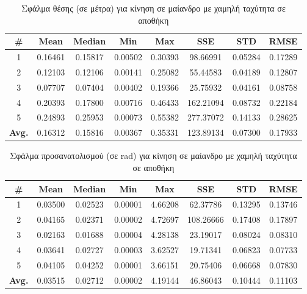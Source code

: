 \begin{table}[H]
    \begin{center}
        \centering
        \caption{Σφάλμα θέσης (σε μέτρα) για κίνηση σε μαίανδρο με χαμηλή ταχύτητα σε αποθήκη}
        \label{tab:position_error_meander_slow_warehouse}
        \begin{tabular}{| c | c | c | c | c | c | c | c | }
        \hline
        \rowcolor{Gray}
        \# & Mean & Median & Min & Max & SSE & STD & RMSE \\
        \hline
        1 & 0.16461 & 0.15817 & 0.00502 & 0.30393 & 98.66991 & 0.05284 & 0.17289 \\
        2 & 0.12103 & 0.12106 & 0.00141 & 0.25082 & 55.44583 & 0.04189 & 0.12807 \\
        3 & 0.07707 & 0.07404 & 0.00402 & 0.19366 & 25.75932 & 0.04161 & 0.08758 \\
        4 & 0.20393 & 0.17800 & 0.00716 & 0.46433 & 162.21094 & 0.08732 & 0.22184 \\
        5 & 0.24893 & 0.25953 & 0.00073 & 0.55382 & 277.37072 & 0.14133 & 0.28625 \\
        \hline
        \textbf{Avg.} & 0.16312 & 0.15816 & 0.00367 & 0.35331 & 123.89134 & 0.07300 & 0.17933 \\
        \hline
        \end{tabular}
    \end{center}
\end{table}

\begin{table}[H]
    \centering
    \caption{Σφάλμα προσανατολισμού (σε rad) για κίνηση σε μαίανδρο με χαμηλή ταχύτητα σε αποθήκη}
    \label{tab:orientation_error_meander_slow_warehouse}
    \begin{tabular}{| c | c | c | c | c | c | c | c | }
        \hline
        \rowcolor{Gray}
        \# & Mean & Median & Min & Max & SSE & STD & RMSE \\
        \hline
        1 & 0.03500 & 0.02523 & 0.00001 & 4.66208 & 62.37786 & 0.13295 & 0.13746 \\
        2 & 0.04165 & 0.02371 & 0.00002 & 4.72697 & 108.26666 & 0.17408 & 0.17897 \\
        3 & 0.02163 & 0.01688 & 0.00004 & 4.28138 & 23.19017 & 0.08024 & 0.08310 \\
        4 & 0.03641 & 0.02727 & 0.00003 & 3.62527 & 19.71341 & 0.06823 & 0.07733 \\
        5 & 0.04105 & 0.04252 & 0.00001 & 3.66151 & 20.75406 & 0.06668 & 0.07830 \\
        \hline
        \textbf{Avg.} & 0.03515 & 0.02712 & 0.00002 & 4.19144 & 46.86043 & 0.10444 & 0.11103 \\
        \hline
    \end{tabular}
\end{table}


